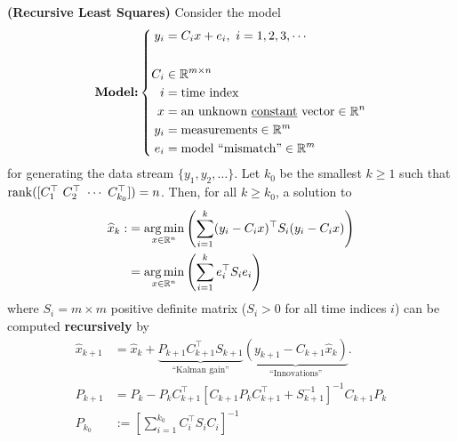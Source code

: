 \begin{prop} 
\label{prop:RLS}
\textbf{(Recursive Least Squares)} Consider the model
\begin{equation}
  \textbf{Model:}\left\{ 
    \begin{aligned}
        y_i&=C_ix+e_i,\ i=1, 2, 3, \dotsb\\
        \\
        C_i& \in \mathbb R^{m \times n}\\
        i&=\textnormal{time index}\\
        x&=\textnormal{an unknown \underline{constant} vector} \in \mathbb R^n\\
        y_i&=\textnormal{measurements} \in \mathbb R^m\\
        e_i&=\textnormal{model ``mismatch''} \in \mathbb R^m
    \end{aligned} \right.
\end{equation}
for generating the data stream $\{y_1, y_2, \ldots \}$. Let $k_0$ be the smallest $k \ge 1$ such that $\mathrm{rank}([C_1^\top~ C_2^\top~ \cdots~ C_{k_0}^\top])=n$. Then, for all $k \ge k_0$, a solution to 
 \begin{align*}
        \widehat{x}_k:&=\underset{x \in \mathbb R^n}{\operatorname*{arg\,min}} \left(\sum\limits_{i=1}^k (y_i-C_ix)^\top S_i(y_i-C_ix)\right)\\
        &=\underset{x \in \mathbb R^n}{\operatorname*{arg\,min}} \left(\sum\limits_{i=1}^k e_i^\top S_ie_i\right)
    \end{align*}
    where $S_i=m \times m$ positive definite matrix ($ S_i>0 $ for all time indices $i$) can be computed \textbf{recursively} by
    \begin{align*}
                    \widehat{x}_{k+1}&=\widehat{x}_k+\underbrace{P_{k+1}C_{k+1}^\top S_{k+1}}_{\text{``Kalman gain''}} \underbrace{(y_{k+1}-C_{k+1}\widehat{x}_k)}_{\text{``Innovations''}}.\\
         P_{k+1}&=P_k-P_kC_{k+1}^\top\left[C_{k+1}P_kC_{k+1}^\top+S_{k+1}^{-1}\right]^{-1}C_{k+1}P_k\\
         P_{k_0}&:= \left[ \sum\limits_{i=1}^{k_0} C_i^\top S_iC_i \right]^{-1}
    \end{align*}



\end{prop}

